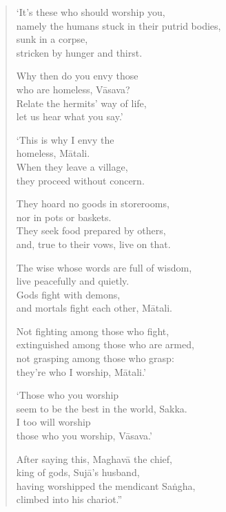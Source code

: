 \documentclass[12pt,openany]{book}%
\begin{document}
\begin{verse}%
‘It’s these who should worship you, \\
namely the humans stuck in their putrid bodies, \\
sunk in a corpse, \\
stricken by hunger and thirst. 

Why then do you envy those \\
who are homeless, \textsanskrit{Vāsava}? \\
Relate the hermits’ way of life, \\
let us hear what you say.’ 

‘This is why I envy the \\
homeless, \textsanskrit{Mātali}. \\
When they leave a village, \\
they proceed without concern. 

They hoard no goods in storerooms, \\
nor in pots or baskets. \\
They seek food prepared by others, \\
and, true to their vows, live on that. 

The wise whose words are full of wisdom, \\
live peacefully and quietly. \\
Gods fight with demons, \\
and mortals fight each other, \textsanskrit{Mātali}. 

Not fighting among those who fight, \\
extinguished among those who are armed, \\
not grasping among those who grasp: \\
they’re who I worship, \textsanskrit{Mātali}.’ 

‘Those who you worship \\
seem to be the best in the world, Sakka. \\
I too will worship \\
those who you worship, \textsanskrit{Vāsava}.’ 

After saying this, \textsanskrit{Maghavā} the chief, \\
king of gods, \textsanskrit{Sujā}’s husband, \\
having worshipped the mendicant \textsanskrit{Saṅgha}, \\
climbed into his chariot.” 

%
\end{verse}
\end{document}
